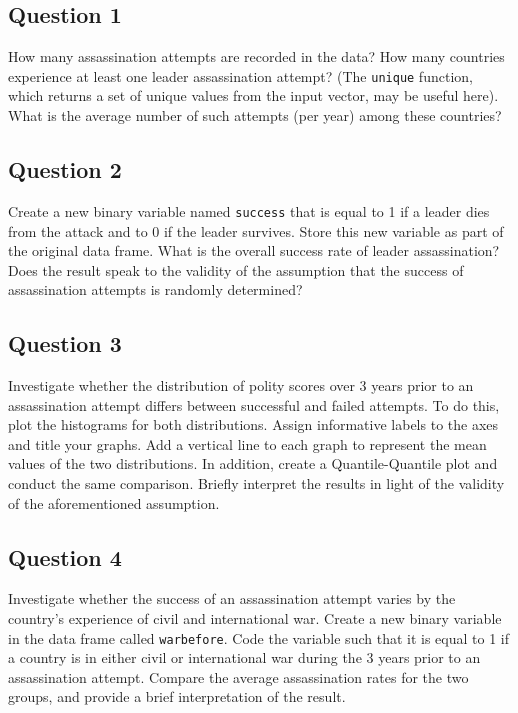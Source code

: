 \documentclass[]{article}
\begin{document}
\subsection{Question 1}\label{question-1}

How many assassination attempts are recorded in the data? How many
countries experience at least one leader assassination attempt? (The
\texttt{unique} function, which returns a set of unique values from the
input vector, may be useful here). What is the average number of such
attempts (per year) among these countries?

\subsection{Question 2}\label{question-2}

Create a new binary variable named \texttt{success} that is equal to 1
if a leader dies from the attack and to 0 if the leader survives. Store
this new variable as part of the original data frame. What is the
overall success rate of leader assassination? Does the result speak to
the validity of the assumption that the success of assassination
attempts is randomly determined?

\subsection{Question 3}\label{question-3}

Investigate whether the distribution of polity scores over 3 years prior
to an assassination attempt differs between successful and failed
attempts. To do this, plot the histograms for both distributions. Assign
informative labels to the axes and title your graphs. Add a vertical
line to each graph to represent the mean values of the two
distributions. In addition, create a Quantile-Quantile plot and conduct
the same comparison. Briefly interpret the results in light of the
validity of the aforementioned assumption.

\subsection{Question 4}\label{question-4}

Investigate whether the success of an assassination attempt varies by
the country's experience of civil and international war. Create a new
binary variable in the data frame called \texttt{warbefore}. Code the
variable such that it is equal to 1 if a country is in either civil or
international war during the 3 years prior to an assassination attempt.
Compare the average assassination rates for the two groups, and provide
a brief interpretation of the result.
\end{document}
